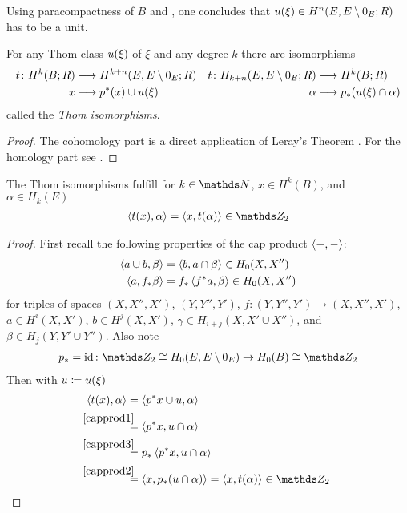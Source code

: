 \begin{Rem}
  Using paracompactness of $B$ and
  \cite[Proposition~17.9.6]{tomdieck}, one concludes that
  $u(\xi)\in H^n(E,E\setminus0_{E};R)$ has to be a unit.
\end{Rem}

\begin{Thm}
  For any Thom class $u(\xi)$ of $\xi$ and any degree $k$ there are
  isomorphisms
  \begin{align*}
    t\colon
    H^k(B;R) &\longrightarrow H^{k+n}(E, E\setminus0_{E}; R)
    & t\colon
      H_{k+n}(E, E\setminus0_{E}; R) &\longrightarrow H^k(B;R)
    \\
    x &\longrightarrow {p}^* (x) \cup u(\xi)
    & \alpha &\longrightarrow {p}_* (u(\xi) \cap \alpha)
  \end{align*}
  called the \emph{Thom isomorphisms}.
  \begin{proof}
    The cohomology part is a direct application of Leray's Theorem
    \cite[Theorem~4D.8]{hatcher}.
    For the homology part see \forexample \cite[Theorem~14.6]{switzer}.
  \end{proof}
\end{Thm}

\begin{Lem}
  The Thom isomorphisms fulfill for $k\in\Nat$, $x\in H^k(B)$, and $\alpha\in H_k(E)$
  \begin{gather*}
    \capped{t(x)}{\alpha} = \capped{x}{t(\alpha)} \in\Zmod2
  \end{gather*}
  \begin{proof}
    First recall the following properties of the cap product
    $\left\langle -, - \right\rangle$:
    \begin{align}
      \label{capprod1}
      \left\langle a\cup b, \beta \right\rangle &= \left\langle b, a\cap\beta \right\rangle
      \in H_0(X,X'')\\
      \label{capprod2}
      \left\langle a, {f}_* \beta \right\rangle &= {f}_* \left\langle {f}^* a, \beta \right\rangle
      \in H_0(X,X'')
    \end{align}
    for
    triples of spaces $(X, X'', X')$, $(Y, Y'', Y')$,
    $f\colon (Y,Y'',Y')\to (X,X'',X')$,
    $a\in H^i(X,X')$, $b\in H^j(X,X')$,
    $\gamma\in H_{i+j}(X, X'\cup X'')$,
    and
    $\beta\in H_j(Y, Y'\cup Y'')$.
    Also note
    \begin{gather}
      \label{capprod3}
      \pf p = \Id \colon
      \Zmod2\cong H_0(E,E\setminus\zerosec{E})\to H_0(B)\cong\Zmod2
    \end{gather}
    Then with $u\coloneqq u(\xi)$
    \begin{align*}
      \capped{t(x)}{\alpha}
      &= \capped{\pb p x \cup \u}{\alpha} \\
      &\overset{\mathllap{\eqref{capprod1}}}=
        \capped{\pb p x}{\u\cap\alpha} \\
      &\overset{\mathllap{\eqref{capprod3}}}=
        \pf p\capped{\pb p x}{\u\cap\alpha} \\
      &\overset{\mathllap{\eqref{capprod2}}}=
        \capped{x}{\pf p(u\cap\alpha)}
        = \capped{x}{\thomiso (\alpha)} \in\Zmod2
    \end{align*}
  \end{proof}
\end{Lem}


